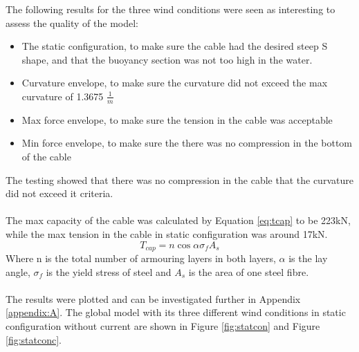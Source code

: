 The following results for the three wind conditions were seen as interesting to assess the quality of the model:
\begin{itemize}
    \item The static configuration, to make sure the cable had the desired steep S shape, and that the buoyancy section was not too high in the water.
    \item Curvature envelope, to make sure the curvature did not exceed the max curvature of 1.3675 $\frac{1}{m}$
    \item Max force envelope, to make sure the tension in the cable was acceptable
    \item Min force envelope, to make sure the there was no compression in the bottom of the cable
\end{itemize}
The testing showed that there was no compression in the cable that the curvature did not exceed it criteria. \\\\  The max capacity of the cable was calculated by Equation \ref{eq:tcap} to be 223kN, while the max tension in the cable in static configuration was around 17kN.
\begin{equation}
    T_{cap}=n \cos{\alpha} \sigma_f A_s
   \label{eq:tcap}
\end{equation}
Where n is the total number of armouring layers in both layers, $\alpha$ is the lay angle, $\sigma_f$ is the yield stress of steel and $A_s$ is the area of one steel fibre.\\\\ 
The results were plotted and can be investigated further in Appendix \ref{appendix:A}. \newline
\newline
The global model with its three different wind conditions in static configuration without current are shown in Figure \ref{fig:statcon} and Figure \ref{fig:statconc}. 

